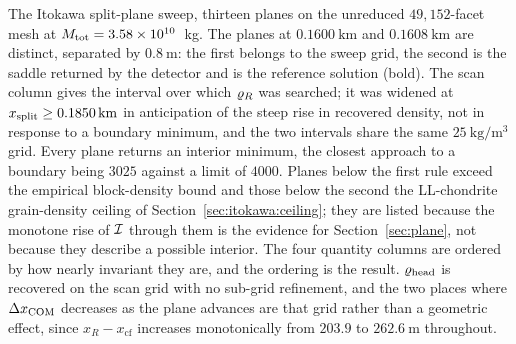 \begin{table}[htbp]
\centering
\small
\setlength{\tabcolsep}{4pt}
\caption{The Itokawa split-plane sweep, thirteen planes on the unreduced
$49{,}152$-facet mesh at $\Mtot = 3.58\times10^{10}$~kg. The planes at
$\SI{0.1600}{\kilo\metre}$ and $\SI{0.1608}{\kilo\metre}$ are distinct,
separated by $\SI{0.8}{\metre}$: the first belongs to the sweep grid, the
second is the saddle returned by the detector and is the reference
solution (bold). The scan column gives the interval over which $\densR$
was searched; it was widened at $\xsplit \ge \SI{0.1850}{\kilo\metre}$ in
anticipation of the steep rise in recovered density, not in response to a
boundary minimum, and the two intervals share the same
$\SI{25}{\kilo\gram\per\cubic\metre}$ grid. Every plane returns an
interior minimum, the closest approach to a boundary being $3025$ against
a limit of $4000$. Planes below the first rule exceed the empirical
block-density bound and those below the second the LL-chondrite
grain-density ceiling of Section~\ref{sec:itokawa:ceiling}; they are
listed because the monotone rise of $\improve$ through them is the
evidence for Section~\ref{sec:plane}, not because they describe a
possible interior. The four quantity columns are ordered by how nearly
invariant they are, and the ordering is the result. $\denshead$ is
recovered on the scan grid with no sub-grid refinement, and the two
places where $\dCOM$ decreases as the plane advances are that grid rather
than a geometric effect, since $x_R - x_{\mathrm{cf}}$ increases
monotonically from $203.9$ to $\SI{262.6}{\metre}$ throughout.}


\end{table}
